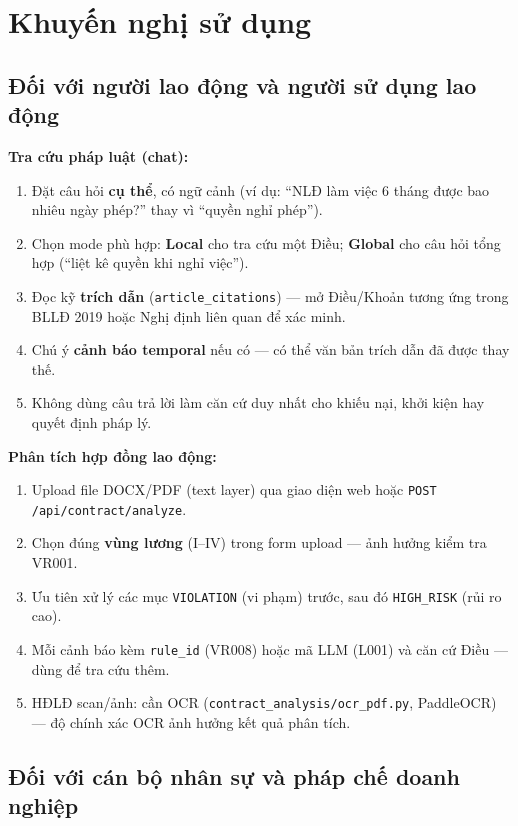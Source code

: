 \documentclass[../DoAn.tex]{subfiles}
\begin{document}
\section{Khuyến nghị sử dụng}
\label{section:7.2}

\subsection{Đối với người lao động và người sử dụng lao động}
\label{subsection:7.2.1}

\textbf{Tra cứu pháp luật (chat):}
\begin{enumerate}[nosep, leftmargin=*]
    \item Đặt câu hỏi \textbf{cụ thể}, có ngữ cảnh (ví dụ: ``NLĐ làm việc 6 tháng được bao nhiêu ngày phép?'' thay vì ``quyền nghỉ phép'').
    \item Chọn mode phù hợp: \textbf{Local} cho tra cứu một Điều; \textbf{Global} cho câu hỏi tổng hợp (``liệt kê quyền khi nghỉ việc'').
    \item Đọc kỹ \textbf{trích dẫn} (\texttt{article\_citations}) --- mở Điều/Khoản tương ứng trong BLLĐ 2019 hoặc Nghị định liên quan để xác minh.
    \item Chú ý \textbf{cảnh báo temporal} nếu có --- có thể văn bản trích dẫn đã được thay thế.
    \item Không dùng câu trả lời làm căn cứ duy nhất cho khiếu nại, khởi kiện hay quyết định pháp lý.
\end{enumerate}

\textbf{Phân tích hợp đồng lao động:}
\begin{enumerate}[nosep, leftmargin=*]
    \item Upload file DOCX/PDF (text layer) qua giao diện web hoặc \texttt{POST /api/contract/analyze}.
    \item Chọn đúng \textbf{vùng lương} (I--IV) trong form upload --- ảnh hưởng kiểm tra VR001.
    \item Ưu tiên xử lý các mục \texttt{VIOLATION} (vi phạm) trước, sau đó \texttt{HIGH\_RISK} (rủi ro cao).
    \item Mỗi cảnh báo kèm \texttt{rule\_id} (VR008) hoặc mã LLM (L001) và căn cứ Điều --- dùng để tra cứu thêm.
    \item HĐLĐ scan/ảnh: cần OCR (\texttt{contract\_analysis/ocr\_pdf.py}, PaddleOCR) --- độ chính xác OCR ảnh hưởng kết quả phân tích.
\end{enumerate}

\subsection{Đối với cán bộ nhân sự và pháp chế doanh nghiệp}
\label{subsection:7.2.2}
\end{document}
